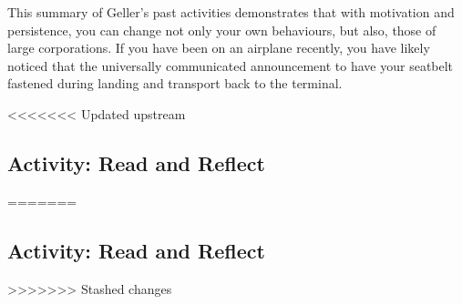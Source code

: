 \documentclass[
]{book}
\begin{document}
This summary of Geller's past activities demonstrates that with motivation and persistence, you can change not only your own behaviours, but also, those of large corporations. If you have been on an airplane recently, you have likely noticed that the universally communicated announcement to have your seatbelt fastened during landing and transport back to the terminal.

<<<<<<< Updated upstream
\hypertarget{activity-read-and-reflect-14}{%
\subsection*{Activity: Read and Reflect}\label{activity-read-and-reflect-14}}
=======
\hypertarget{activity-read-and-reflect-13}{%
\subsection*{Activity: Read and Reflect}\label{activity-read-and-reflect-13}}
>>>>>>> Stashed changes
\end{document}
